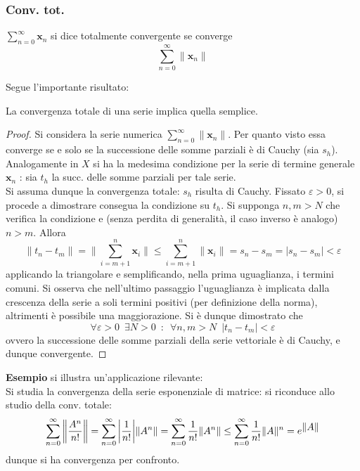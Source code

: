 \documentclass[10pt, oneside]{book}
\theoremstyle{plain}
\begin{document}
\subsubsection*{Conv. tot.}
\begin{defin}
$\displaystyle \sum\limits_{n=0}^\infty \mathbf{x}_n$ si dice totalmente convergente se converge
\[\sum\limits_{n=0}^\infty \|\mathbf{x}_n\|\]
\end{defin}
Segue l'importante risultato:
\begin{prop}
La convergenza totale di una serie implica quella semplice.
\end{prop}
\begin{proof}
Si considera la serie numerica $\displaystyle \sum\limits_{n=0}^\infty \|\mathbf{x}_n\|$. Per quanto visto essa converge se e solo se la successione delle somme parziali è di Cauchy (sia $s_h$). Analogamente in $X$ si ha la medesima condizione per la serie di termine generale $\mathbf{x}_n$ : sia $t_h$ la succ. delle somme parziali per tale serie.
\\Si assuma dunque la convergenza totale: $s_h$ risulta di Cauchy. Fissato $\varepsilon >0$, si procede a dimostrare consegua la condizione su $t_h$. Si supponga $n, m > N$ che verifica la condizione e (senza perdita di generalità, il caso inverso è analogo) $n > m$. Allora
\[\|t_n - t_m\| = \|\sum\limits_{i=m+1}^{n} \mathbf{x}_i \| \leq  \sum\limits_{i=m+1}^{n} \|\mathbf{x}_i \| = s_n - s_m = |s_n - s_m| < \varepsilon\]
applicando la triangolare e semplificando, nella prima uguaglianza, i termini comuni. Si osserva che nell'ultimo passaggio l'uguaglianza è implicata dalla crescenza della serie a soli termini positivi (per definizione della norma), altrimenti è possibile una maggiorazione. Si è dunque dimostrato che
\[\forall \varepsilon > 0 \enspace \exists N > 0 \enspace : \enspace \forall n,m > N \enspace |t_n - t_m| < \varepsilon\]
ovvero la successione delle somme parziali della serie vettoriale è di Cauchy, e dunque convergente.
\end{proof}

\textbf{Esempio }si illustra un'applicazione rilevante:
\\Si studia la convergenza della serie esponenziale di matrice: si riconduce allo studio della conv. totale:
\[\sum\limits_{n=0}^\infty \bigg{\|}\frac{A^n}{n!}\bigg{\|} = \sum\limits_{n=0}^\infty\bigg|\frac{1}{n!}\bigg|\|A^n\| = \sum\limits_{n=0}^\infty\frac{1}{n!}\|A^n\| \leq \sum\limits_{n=0}^\infty\frac{1}{n!}\|A\|^n = e^{\displaystyle \|A\|}\]
dunque si ha convergenza per confronto.
\end{document}
